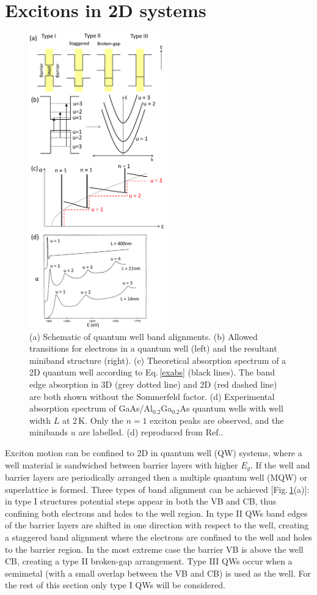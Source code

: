 \section{Excitons in 2D systems}
\label{sec:ex2D}
\begin{figure}[h!] 
\centering    
\includegraphics[width=0.53\textwidth]{Fig2}
\caption{(a) Schematic of quantum well band alignments. (b) Allowed transitions for electrons in a quantum well (left) and the resultant miniband structure (right). (c) Theoretical absorption spectrum of a 2D quantum well according to Eq.\,\ref{exabs} (black lines). The band edge absorption in 3D (grey dotted line) and 2D (red dashed line) are both shown without the Sommerfeld factor. (d) Experimental absorption spectrum of GaAs/Al$_{0.2}$Ga$_{0.2}$As quantum wells with well width $L$ at 2\,K. Only the $n=1$ exciton peaks are observed, and the minibands $u$ are labelled. (d) reproduced from Ref.\!.}
\label{2Fig2}
\end{figure}
Exciton motion can be confined to 2D in quantum well (QW) systems, where a well material is sandwiched between barrier layers with higher $E_g$. If the well and barrier layers are periodically arranged then a multiple quantum well (MQW) or superlattice is formed. Three types of band alignment can be achieved [Fig.\,\ref{2Fig2}(a)]: in type I structures potential steps appear in both the VB and CB, thus confining both electrons and holes to the well region. In type II QWs band edges of the barrier layers are shifted in one direction with respect to the well, creating a staggered band alignment where the electrons are confined to the well and holes to the barrier region. In the most extreme case the barrier VB is above the well CB, creating a type II broken-gap arrangement. Type III QWs occur when a semimetal (with a small overlap between the VB and CB) is used as the well. For the rest of this section only type I QWs will be considered.

